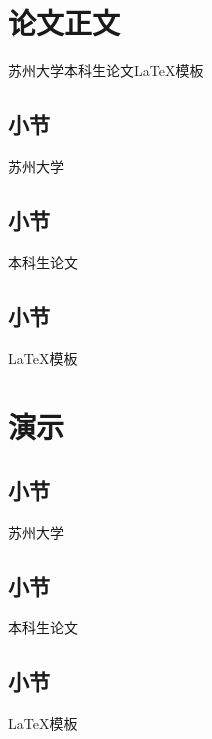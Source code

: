 \section{论文正文}
苏州大学本科生论文LaTeX模板
\subsection{小节}
苏州大学
\subsection{小节}
本科生论文
\subsection{小节}
LaTeX模板

\section{演示}
\subsection{小节}
苏州大学
\subsection{小节}
本科生论文
\subsection{小节}
LaTeX模板